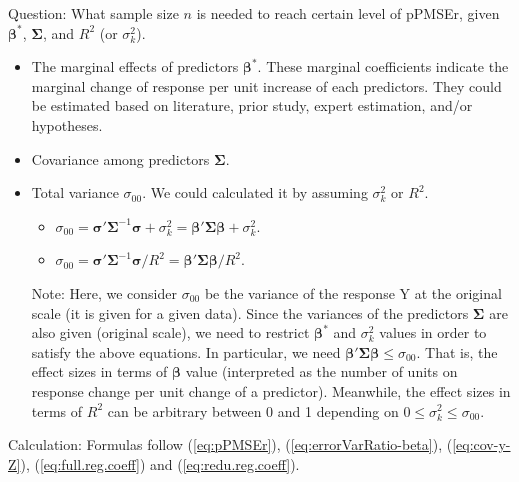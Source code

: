\documentclass[11pt]{article}
\begin{document}
Question: What sample size $n$ is needed to reach certain level of pPMSEr, given $\boldsymbol{\beta}^*$, $\boldsymbol{\Sigma}$, and $R^2$ (or $\sigma_k^2$). 

\begin{itemize}
\item The marginal effects of predictors $\boldsymbol{\beta}^*$. These marginal coefficients indicate the marginal change of response per unit increase of each predictors. They could be estimated based on literature, prior study, expert estimation, and/or hypotheses. 

\item Covariance among predictors $\boldsymbol{\Sigma}$. 

\item Total variance $\sigma_{00}$. We could calculated it by assuming $\sigma_k^2$ or $R^2$. 
\begin{itemize}
\item $\sigma_{00}
=\boldsymbol{\sigma}' \boldsymbol{\Sigma}^{-1} \boldsymbol{\sigma} + \sigma_k^2
=\boldsymbol{\beta}' \boldsymbol{\Sigma} \boldsymbol{\beta} + \sigma_k^2$. %
\item $\sigma_{00}
=\boldsymbol{\sigma}' \boldsymbol{\Sigma}^{-1} \boldsymbol{\sigma}/R^2
=\boldsymbol{\beta}' \boldsymbol{\Sigma} \boldsymbol{\beta}  / R^2$.
\end{itemize}


Note: Here, we consider $\sigma_{00}$ be the variance of the response Y at the original scale (it is given for a given data). Since the variances of the predictors $\boldsymbol{\Sigma}$ are also given (original scale), we need to restrict $\boldsymbol{\beta}^*$ and $\sigma_k^2$ values in order to satisfy the above equations. In particular, we need $\boldsymbol{\beta}' \boldsymbol{\Sigma} \boldsymbol{\beta} \leq \sigma_{00}$. That is, the effect sizes in terms of $\boldsymbol{\beta}$ value (interpreted as the number of units on response change per unit change of a predictor).  Meanwhile, the effect sizes in terms of $R^2$ can be arbitrary between 0 and 1 depending on $0 \leq \sigma_k^2 \leq \sigma_{00}$. 

\end{itemize}

Calculation: Formulas follow (\ref{eq:pPMSEr}), (\ref{eq:errorVarRatio-beta}), (\ref{eq:cov-y-Z}), (\ref{eq:full.reg.coeff}) and (\ref{eq:redu.reg.coeff}). 




%
\end{document}
